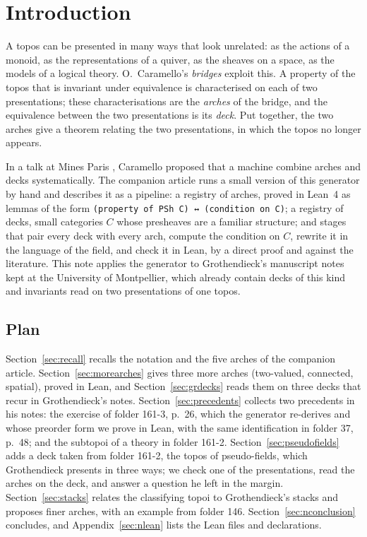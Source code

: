 \section{Introduction}\label{sec:nintro}

A topos can be presented in many ways that look unrelated: as the actions of a monoid, as the representations of a quiver, as the sheaves on a space, as the models of a logical theory. O.~Caramello's \emph{bridges} \cite{caramello-unification,caramello-tst} exploit this. A property of the topos that is invariant under equivalence is characterised on each of two presentations; these characterisations are the \emph{arches} of the bridge, and the equivalence between the two presentations is its \emph{deck}. Put together, the two arches give a theorem relating the two presentations, in which the topos no longer appears.

In a talk at Mines Paris \cite{caramello-mines}, Caramello proposed that a machine combine arches and decks systematically. The companion article \cite{bridges-generator} runs a small version of this generator by hand and describes it as a pipeline: a registry of arches, proved in Lean~4 as lemmas of the form \texttt{(property of PSh C) ↔ (condition on C)}; a registry of decks, small categories $C$ whose presheaves are a familiar structure; and stages that pair every deck with every arch, compute the condition on $C$, rewrite it in the language of the field, and check it in Lean, by a direct proof and against the literature. This note applies the generator to Grothendieck's manuscript notes kept at the University of Montpellier, which already contain decks of this kind and invariants read on two presentations of one topos.

\subsection*{Plan}

Section~\ref{sec:recall} recalls the notation and the five arches of the companion article. Section~\ref{sec:morearches} gives three more arches (two-valued, connected, spatial), proved in Lean, and Section~\ref{sec:grdecks} reads them on three decks that recur in Grothendieck's notes. Section~\ref{sec:precedents} collects two precedents in his notes: the exercise of folder 161-3, p.~26, which the generator re-derives and whose preorder form we prove in Lean, with the same identification in folder 37, p.~48; and the subtopoi of a theory in folder 161-2. Section~\ref{sec:pseudofields} adds a deck taken from folder 161-2, the topos of pseudo-fields, which Grothendieck presents in three ways; we check one of the presentations, read the arches on the deck, and answer a question he left in the margin. Section~\ref{sec:stacks} relates the classifying topoi to Grothendieck's stacks and proposes finer arches, with an example from folder 146. Section~\ref{sec:nconclusion} concludes, and Appendix~\ref{sec:nlean} lists the Lean files and declarations.
